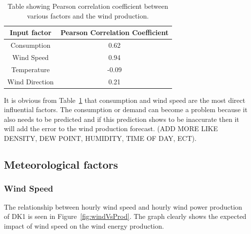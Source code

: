\begin{table}[H]
\centering  %
\begin{tabular}{c c} %
Input factor & Pearson Correlation Coefficient \\ [0.5ex] %
\hline                  %
Consumption & 0.62 \\ %
Wind Speed & 0.94 \\
Temperature & -0.09 \\
Wind Direction & 0.21 \\ [1ex] %
\hline %
\end{tabular}
\caption{Table showing Pearson correlation coefficient between various factors and the wind production.} %
\label{table:pearsonCoeficientWindProduction} %
\end{table}

It is obvious from Table~\ref{table:pearsonCoeficientWindProduction} that consumption and wind speed are the most direct influential factors. The consumption or demand can become a problem because it also needs to be predicted and if this prediction shows to be inaccurate then it will add the error to the wind production forecast.  (ADD MORE LIKE DENSITY, DEW POINT, HUMIDITY, TIME OF DAY, ECT).

\subsection{Meteorological factors}

\subsubsection{Wind Speed}
The relationship between hourly wind speed and hourly wind power production of DK1 is seen in Figure~\ref{fig:windVsProd}. The graph clearly shows the expected impact of wind speed on the wind energy production.

